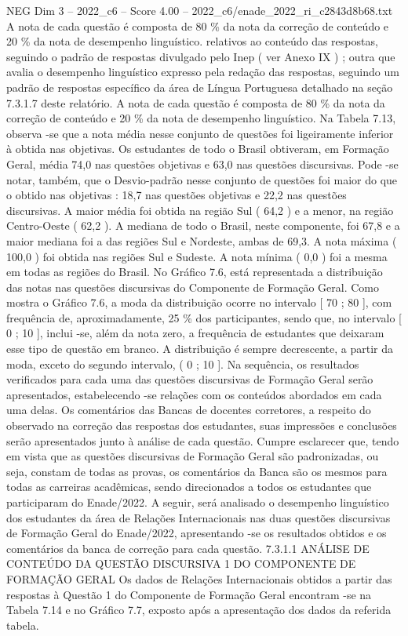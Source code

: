\begin{textsample}{NEG Dim 3 – 2022\_c6 – Score 4.00 – 2022\_c6/enade\_2022\_ri\_c2843d8b68.txt}
A nota de cada questão é composta de 80 \% da nota da correção de conteúdo e 20 \% da nota de desempenho linguístico. relativos ao conteúdo das respostas, seguindo o padrão de respostas divulgado pelo Inep ( ver Anexo IX ) ; outra que avalia o desempenho linguístico expresso pela redação das respostas, seguindo um padrão de respostas específico da área de Língua Portuguesa detalhado na seção 7.3.1.7 deste relatório.
A nota de cada questão é composta de 80 \% da nota da correção de conteúdo e 20 \% da nota de desempenho linguístico.
Na Tabela 7.13, observa -se que a nota média nesse conjunto de questões foi ligeiramente inferior à obtida nas objetivas.
Os estudantes de todo o Brasil obtiveram, em Formação Geral, média 74,0 nas questões objetivas e 63,0 nas questões discursivas.
Pode -se notar, também, que o Desvio-padrão nesse conjunto de questões foi maior do que o obtido nas objetivas : 18,7 nas questões objetivas e 22,2 nas questões discursivas.
A maior média foi obtida na região Sul ( 64,2 ) e a menor, na região Centro-Oeste ( 62,2 ).
A mediana de todo o Brasil, neste componente, foi 67,8 e a maior mediana foi a das regiões Sul e Nordeste, ambas de 69,3.
A nota máxima ( 100,0 ) foi obtida nas regiões Sul e Sudeste.
A nota mínima ( 0,0 ) foi a mesma em todas as regiões do Brasil.
No Gráfico 7.6, está representada a distribuição das notas nas questões discursivas do Componente de Formação Geral.
Como mostra o Gráfico 7.6, a moda da distribuição ocorre no intervalo [ 70 ; 80 ], com frequência de, aproximadamente, 25 \% dos participantes, sendo que, no intervalo [ 0 ; 10 ], inclui -se, além da nota zero, a frequência de estudantes que deixaram esse tipo de questão em branco.
A distribuição é sempre decrescente, a partir da moda, exceto do segundo intervalo, ( 0 ; 10 ].
Na sequência, os resultados verificados para cada uma das questões discursivas de Formação Geral serão apresentados, estabelecendo -se relações com os conteúdos abordados em cada uma delas.
Os comentários das Bancas de docentes corretores, a respeito do observado na correção das respostas dos estudantes, suas impressões e conclusões serão apresentados junto à análise de cada questão.
Cumpre esclarecer que, tendo em vista que as questões discursivas de Formação Geral são padronizadas, ou seja, constam de todas as provas, os comentários da Banca são os mesmos para todas as carreiras acadêmicas, sendo direcionados a todos os estudantes que participaram do Enade/2022.
A seguir, será analisado o desempenho linguístico dos estudantes da área de Relações Internacionais nas duas questões discursivas de Formação Geral do Enade/2022, apresentando -se os resultados obtidos e os comentários da banca de correção para cada questão. 7.3.1.1 ANÁLISE DE CONTEÚDO DA QUESTÃO DISCURSIVA 1 DO COMPONENTE DE FORMAÇÃO GERAL Os dados de Relações Internacionais obtidos a partir das respostas à Questão 1 do Componente de Formação Geral encontram -se na Tabela 7.14 e no Gráfico 7.7, exposto após a apresentação dos dados da referida tabela.

\end{textsample}
